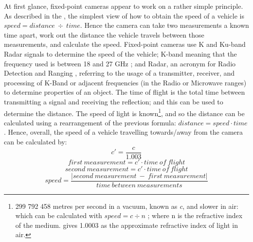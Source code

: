 \documentclass[11pt, a4paper, notitlepage]{report}
\begin{document}
At first glance, fixed-point cameras appear to work on a rather simple principle. As described in the , the simplest view of how to obtain the speed of a vehicle is $ speed = distance~\div~time $. Hence the camera can take two measurements a known time apart, work out the distance the vehicle travels between those measurements, and calculate the speed. 
Fixed-point cameras use K and Ku-band Radar signals to determine the speed of the vehicle; K-band meaning that the frequency used is between 18 and 27 GHz \citep{IEEERadar}; and Radar, an acronym for Radio Detection and Ranging \citep{RadarNaming}, referring to the usage of a transmitter, receiver, and processing of K-Band or adjacent frequencies (in the Radio or Microwave ranges) to determine properties of an object. The time of flight is the total time between transmitting a signal and receiving the reflection; and this can be used to determine the distance. The speed of light is known\footnote{299 792 458 metres per second in a vacuum, known as \textit{c}, and slower in air: which can be calculated with $ speed = c \div n $ \citep{HechtOptics}; where n is the refractive index of the medium. \citet{refIndxAir} gives 1.0003 as the approximate refractive index of light in air.}, and so the distance can be calculated using a rearrangement of the previous formula: $ distance = speed  \cdot time $. Hence, overall, the speed of a vehicle travelling towards/away from the camera can be calculated by:
\begin{equation}
	c' = \frac{c}{1.003}
\end{equation}
\begin{equation}
	first~measurement = c' \cdot time~of~flight
\end{equation}
\begin{equation}
	second~measurement = c' \cdot time~of~flight
\end{equation}
\begin{equation}
	speed = \frac{\left|second~measurement~-~first~measurement\right|}{time~between~measurements}
\end{equation}
\end{document}
